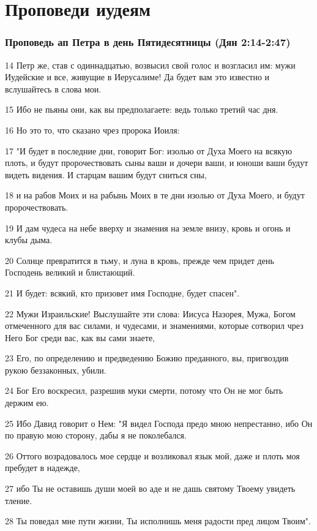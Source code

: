 \chapter{Проповеди иудеям}
\label{cha:appendix1}

\subsection*{Проповедь ап Петра в день Пятидесятницы (Дян 2:14-2:47)}
14 Петр же, став с одиннадцатью, возвысил свой голос и возгласил им: мужи Иудейские и все, живущие в Иерусалиме! Да будет вам это известно и вслушайтесь в слова мои.

15 Ибо не пьяны они, как вы предполагаете: ведь только третий час дня.

16 Но это то, что сказано чрез пророка Иоиля:

17 "И будет в последние дни, говорит Бог: изолью от Духа Моего на всякую плоть, и будут пророчествовать сыны ваши и дочери ваши, и юноши ваши будут видеть видения. И старцам вашим будут сниться сны,

18 и на рабов Моих и на рабынь Моих в те дни изолью от Духа Моего, и будут пророчествовать.

19 И дам чудеса на небе вверху и знамения на земле внизу, кровь и огонь и клубы дыма.

20 Солнце превратится в тьму, и луна в кровь, прежде чем придет день Господень великий и блистающий.

21 И будет: всякий, кто призовет имя Господне, будет спасен".

22 Мужи Израильские! Выслушайте эти слова: Иисуса Назорея, Мужа, Богом отмеченного для вас силами, и чудесами, и знамениями, которые сотворил чрез Него Бог среди вас, как вы сами знаете,

23 Его, по определению и предведению Божию преданного, вы, пригвоздив рукою беззаконных, убили.

24 Бог Его воскресил, разрешив муки смерти, потому что Он не мог быть держим ею.

25 Ибо Давид говорит о Нем: "Я видел Господа предо мною непрестанно, ибо Он по правую мою сторону, дабы я не поколебался.

26 Оттого возрадовалось мое сердце и возликовал язык мой, даже и плоть моя пребудет в надежде,

27 ибо Ты не оставишь души моей во аде и не дашь святому Твоему увидеть тление.

28 Ты поведал мне пути жизни, Ты исполнишь меня радости пред лицом Твоим".

